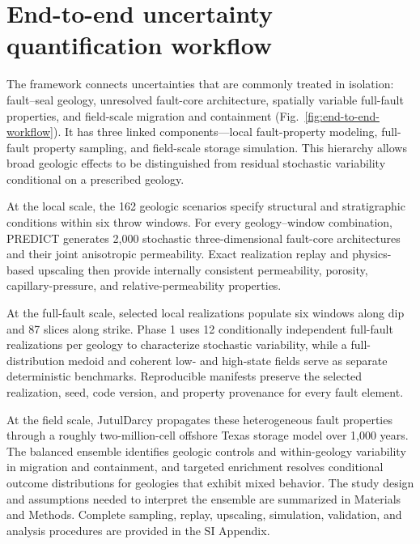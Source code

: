 
\section{End-to-end uncertainty quantification workflow}

The framework connects uncertainties that are commonly treated in isolation:
fault--seal geology, unresolved fault-core architecture, spatially variable
full-fault properties, and field-scale \coTwo{} migration and containment
(Fig.~\ref{fig:end-to-end-workflow}). It has three linked components---local
fault-property modeling, full-fault property sampling, and field-scale storage
simulation. This hierarchy allows broad geologic effects to be distinguished
from residual stochastic variability conditional on a prescribed geology.

At the local scale, the 162 geologic scenarios specify structural and
stratigraphic conditions within six throw windows. For every geology--window
combination, PREDICT generates 2,000 stochastic three-dimensional fault-core
architectures and their joint anisotropic permeability. Exact realization
replay and physics-based upscaling then provide internally consistent
permeability, porosity, capillary-pressure, and relative-permeability
properties.

At the full-fault scale, selected local realizations populate six windows
along dip and 87 slices along strike. Phase 1 uses 12 conditionally independent
full-fault realizations per geology to characterize stochastic variability,
while a full-distribution medoid and coherent low- and high-state fields serve
as separate deterministic benchmarks. Reproducible manifests preserve the
selected realization, seed, code version, and property provenance for every
fault element.

At the field scale, JutulDarcy propagates these heterogeneous fault properties
through a roughly two-million-cell offshore Texas storage model over 1,000
years. The balanced ensemble identifies geologic controls and within-geology
variability in migration and containment, and targeted enrichment resolves
conditional outcome distributions for geologies that exhibit mixed behavior.
The study design and assumptions needed to interpret the ensemble are
summarized in Materials and Methods. Complete sampling, replay, upscaling,
simulation, validation, and analysis procedures are provided in the SI
Appendix.
